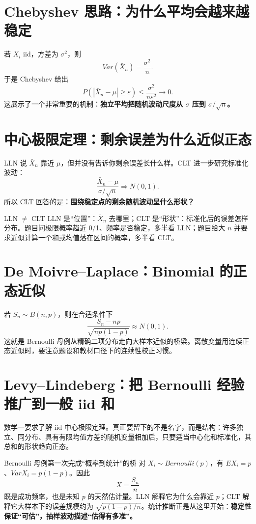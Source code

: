\documentclass[11pt,a4paper,openany]{ctexbook}
\newcommand{\key}[1]{\textbf{\color{deep}#1}}
\begin{document}
\section{Chebyshev 思路：为什么平均会越来越稳定}
若 $X_i$ iid，方差为 $\sigma^2$，则
\[
Var(\bar X_n)=\frac{\sigma^2}{n}.
\]
于是 Chebyshev 给出
\[
P(|\bar X_n-\mu|\ge\varepsilon)\le\frac{\sigma^2}{n\varepsilon^2}\to0.
\]
这展示了一个非常重要的机制：\key{独立平均把随机波动尺度从 $\sigma$ 压到 $\sigma/\sqrt n$。}

\section{中心极限定理：剩余误差为什么近似正态}
LLN 说 $\bar X_n$ 靠近 $\mu$，但并没有告诉你剩余误差长什么样。CLT 进一步研究标准化波动：
\[
\frac{\bar X_n-\mu}{\sigma/\sqrt n}\Rightarrow N(0,1).
\]
所以 CLT 回答的是：\key{围绕稳定点的剩余随机波动呈什么形状？}

\begin{boundarybox}{LLN $\neq$ CLT}
LLN 是“位置”：$\bar X_n$ 去哪里；CLT 是“形状”：标准化后的误差怎样分布。题目问极限概率趋近 0/1、频率是否稳定，多半看 LLN；题目给大 $n$ 并要求近似计算一个和或均值落在区间的概率，多半看 CLT。
\end{boundarybox}

\section{De Moivre--Laplace：Binomial 的正态近似}
若 $S_n\sim B(n,p)$，则在合适条件下
\[
\frac{S_n-np}{\sqrt{np(1-p)}}\approx N(0,1).
\]
这就是 Bernoulli 母例从精确二项分布走向大样本近似的桥梁。离散变量用连续正态近似时，要注意题设和教材口径下的连续性校正习惯。

\section{Levy--Lindeberg：把 Bernoulli 经验推广到一般 iid 和}
数学一要求了解 iid 中心极限定理。真正要留下的不是名字，而是结构：许多独立、同分布、具有有限均值方差的随机变量相加后，只要适当中心化和标准化，其总和的形状趋向正态。

\begin{examplebox}{Bernoulli 母例第一次完成“概率到统计”的桥}
对 $X_i\sim Bernoulli(p)$，有 $EX_i=p$、$VarX_i=p(1-p)$。因此
\[
\bar X=\frac{S_n}{n}
\]
既是成功频率，也是未知 $p$ 的天然估计量。LLN 解释它为什么会靠近 $p$；CLT 解释它大样本下的误差规模约为 $\sqrt{p(1-p)/n}$。统计推断正是从这里开始：\key{稳定性保证“可估”，抽样波动描述“估得有多准”。}
\end{examplebox}
\end{document}

